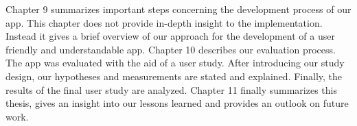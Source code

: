 \newline
Chapter 9 summarizes important steps concerning the development process of our app.
This chapter does not provide in-depth insight to the implementation.
Instead it gives a brief overview of our approach for the development of a user friendly and understandable app.
\newline
Chapter 10 describes our evaluation process.
 The app was evaluated with the aid of a user study.
 After introducing our study design, our hypotheses and measurements are stated and explained.
Finally, the results of the final user study are analyzed.
\newline
Chapter 11 finally summarizes this thesis, gives an insight into our lessons learned and provides an outlook on future work.



